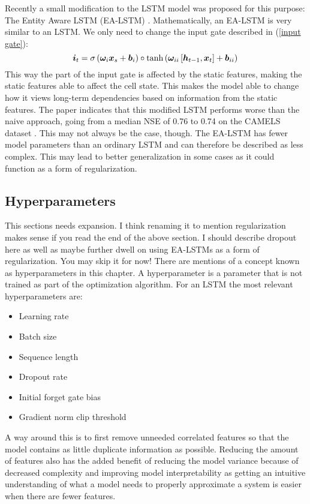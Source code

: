 Recently a small modification to the LSTM model was proposed for this purpose:
The Entity Aware LSTM (EA-LSTM) \citep{lstm_second_paper}. 
Mathematically, an EA-LSTM is very similar to an LSTM. We only need to change the 
input gate described in (\ref{input gate}): 
\begin{equation}
    \bm{i}_t = \sigma\left(\bm{\omega}_i  \bm{x}_s + \bm{b}_i\right) \circ \tanh\left(\bm{\omega}_{ii}\left[ \bm{h}_{t-1},\bm{x}_t  \right] + \bm{b}_{ii}\right) \label{EA-LSTM input gate}\\
\end{equation}
This way the part of the input gate is affected by the static features, making 
the static features able to affect the cell state. This makes the model able to 
change how it views long-term dependencies based on information from the static features. 
The paper 
indicates that this modified LSTM performs worse than the naive approach, going 
from a median NSE of 0.76 to 0.74 on the CAMELS dataset \citep{CAMELS_US}. 
This may not always be the case, though. 
The EA-LSTM has fewer model parameters than an ordinary LSTM and can therefore 
be described as less complex. This may lead to better generalization in some cases as it could 
function as a form of regularization.

\subsection{Hyperparameters}
\label{Hyperparameters}
This sections needs expansion. I think renaming it to mention regularization makes sense 
if you read the end of the above section. I should describe dropout here as well as 
maybe further dwell on using EA-LSTMs as a form of regularization.
You may skip it for now!
There are mentions of a concept known as hyperparameters in this chapter. A hyperparameter 
is a parameter that is not trained as part of the optimization algorithm. For an 
LSTM the most relevant hyperparameters are:
\begin{itemize}
    \item Learning rate
    \item Batch size
    \item Sequence length
    \item Dropout rate
    \item Initial forget gate bias
    \item Gradient norm clip threshold
\end{itemize}

\iffalse
A way around this is to first remove unneeded correlated features so that the model 
contains as little duplicate information as possible. Reducing the amount of 
features also has the added benefit of reducing the model variance because of 
decreased complexity and improving model interpretability as getting an intuitive 
understanding of what a model needs to properly approximate a system is easier when 
there are fewer features.

